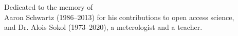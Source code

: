 \thispagestyle{empty}
\null
\vfill
\begin{center}
\noindent
\large
Dedicated to the memory of\\
Aaron Schwartz (1986--2013) for his contributions to open access science,\\
and Dr. Alois Sokol (1973--2020), a meterologist and a teacher.
\end{center}
\vfill

